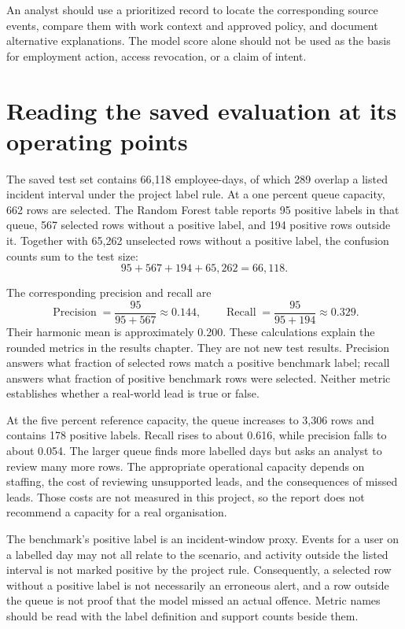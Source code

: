 An analyst should use a prioritized record to locate the corresponding
source events, compare them with work context and approved policy, and
document alternative explanations. The model score alone should not be
used as the basis for employment action, access revocation, or a claim
of intent.

\section{Reading the saved evaluation at its operating points}
The saved test set contains 66,118 employee-days, of which 289 overlap
a listed incident interval under the project label rule. At a one
percent queue capacity, 662 rows are selected. The Random Forest table
reports 95 positive labels in that queue, 567 selected rows without a
positive label, and 194 positive rows outside it. Together with 65,262
unselected rows without a positive label, the confusion counts sum to
the test size:
\[
 95+567+194+65{,}262=66{,}118.
\]

The corresponding precision and recall are
\[
 \operatorname{Precision}=\frac{95}{95+567}\approx0.144,
 \qquad
 \operatorname{Recall}=\frac{95}{95+194}\approx0.329.
\]
Their harmonic mean is approximately 0.200. These calculations explain
the rounded metrics in the results chapter. They are not new test
results. Precision answers what fraction of selected rows match a
positive benchmark label; recall answers what fraction of positive
benchmark rows were selected. Neither metric establishes whether a
real-world lead is true or false.

At the five percent reference capacity, the queue increases to 3,306
rows and contains 178 positive labels. Recall rises to about 0.616,
while precision falls to about 0.054. The larger queue finds more
labelled days but asks an analyst to review many more rows. The
appropriate operational capacity depends on staffing, the cost of
reviewing unsupported leads, and the consequences of missed leads.
Those costs are not measured in this project, so the report does not
recommend a capacity for a real organisation.

The benchmark's positive label is an incident-window proxy. Events for
a user on a labelled day may not all relate to the scenario, and
activity outside the listed interval is not marked positive by the
project rule. Consequently, a selected row without a positive label is
not necessarily an erroneous alert, and a row outside the queue is not
proof that the model missed an actual offence. Metric names should be
read with the label definition and support counts beside them.

